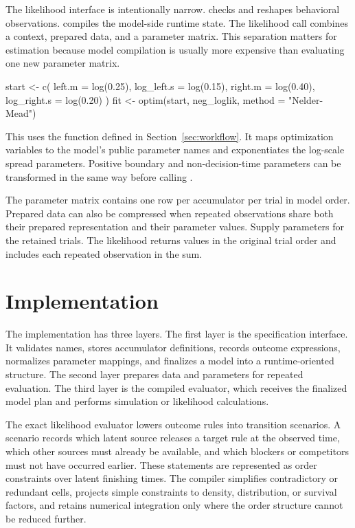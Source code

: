 \documentclass[article]{jss}
\newcommand{\fct}[1]{\code{#1()}}
\begin{document}
The likelihood interface is intentionally narrow. \fct{prepare\_data} checks
and reshapes behavioral observations. \fct{make\_context} compiles the
model-side runtime state. The likelihood call combines a context, prepared
data, and a parameter matrix. This separation matters for estimation because
model compilation is usually more expensive than evaluating one new parameter
matrix.

\begin{Code}
start <- c(
  left.m = log(0.25), log_left.s = log(0.15),
  right.m = log(0.40), log_right.s = log(0.20)
)
fit <- optim(start, neg_loglik, method = "Nelder-Mead")
\end{Code}

This uses the  function defined in
Section~\ref{sec:workflow}. It maps optimization variables to the model's
public parameter names and exponentiates the log-scale spread parameters.
Positive boundary and non-decision-time parameters can be transformed in the
same way before calling \fct{build\_param\_matrix}.

The parameter matrix contains one row per accumulator per trial in model order.
Prepared data can also be compressed when repeated observations share both
their prepared representation and their parameter values. Supply parameters
for the retained trials. The likelihood returns values in the original trial
order and includes each repeated observation in the sum.

\section{Implementation}
\label{sec:implementation}

The implementation has three layers. The first layer is the 
specification interface. It validates names, stores accumulator definitions,
records outcome expressions, normalizes parameter mappings, and finalizes a
model into a runtime-oriented structure. The second layer prepares data and
parameters for repeated evaluation. The third layer is the compiled evaluator,
which receives the finalized model plan and performs simulation or likelihood
calculations.

The exact likelihood evaluator lowers outcome rules into transition scenarios.
A scenario records which latent source releases a target rule at the observed
time, which other sources must already be available, and which blockers or
competitors must not have occurred earlier. These statements are represented as
order constraints over latent finishing times. The compiler simplifies
contradictory or redundant cells, projects simple constraints to density,
distribution, or survival factors, and retains numerical integration only where
the order structure cannot be reduced further.
\end{document}

